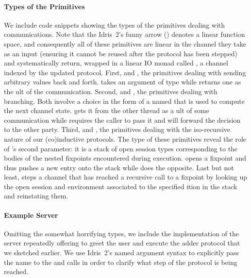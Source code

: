\documentclass{easychair}
\begin{document}
\paragraph{Types of the Primitives} We include code snippets showing the
types of the primitives dealing with communications. Note that the Idris~2's
funny arrow () denotes a linear function space, and
consequently all of these primitives are linear in the channel
they take as an input (ensuring it cannot be reused after the protocol
has been stepped) and systematically return, wrapped in a linear IO
monad called , a channel indexed by the updated protocol.
%
First,  and , the primitives
dealing with sending arbitrary values back and forth.
 takes an argument of type  while
 returns one as the ult of the
communication.
%
%
Second,  and , the primitives
dealing with branching.
%
Both involve a choice in the form of a  named 
that is used to compute the next channel state.
%
 gets it from the other thread as a ult
of some communication while  requires the caller to
pass it and will forward the decision to the other party.
%
%
Third,  and , the
primitives dealing with the iso-recursive nature of our
(co)inductive protocols.
%
The type of these primitives reveal the role of 's
second parameter: it is a stack of open session types corresponding
to the bodies of the nested fixpoints encountered during execution.
%
 opens a fixpoint and thus pushes a new entry onto the
stack  while  does the opposite.
%
Last but not least,  steps a channel that has
reached a recursive call to a fixpoint by looking up the
open session and environment associated to the specified
ition in the stack and reinstating them.

\paragraph{Example Server} Omitting the somewhat horrifying types,
we include the implementation of the server repeatedly offering
to greet the user and execute the adder protocol that we sketched
earlier.
%
We use Idris~2's named argument syntax to explicitly pass the name
 to the  and 
calls in order to clarify what step of the protocol is being reached.
\end{document}
